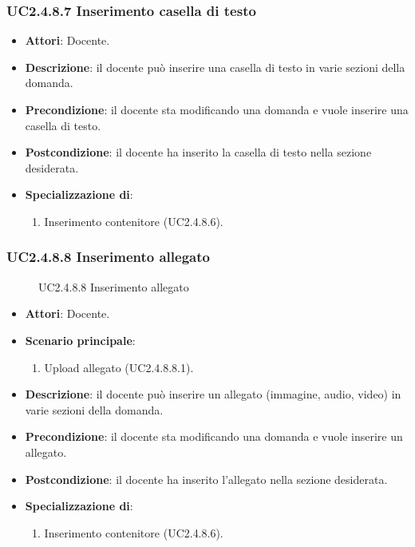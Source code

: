 \subsubsection{UC2.4.8.7 Inserimento casella di testo}
\begin{itemize}
\item \textbf{Attori}: Docente.
\item \textbf{Descrizione}: il docente può inserire una casella di testo in varie sezioni della domanda.
\item \textbf{Precondizione}: il docente sta modificando una domanda e vuole inserire una casella di testo.
\item \textbf{Postcondizione}: il docente ha inserito la casella di testo nella sezione desiderata.
\item \textbf{Specializzazione di}:
\begin{enumerate}
\item Inserimento contenitore (UC2.4.8.6).
\end{enumerate}
\end{itemize}
\subsubsection{UC2.4.8.8 Inserimento allegato}
\begin{figure}[H]
\centering
\noindent{}
\caption{UC2.4.8.8 Inserimento allegato}
\end{figure}
\begin{itemize}
\item \textbf{Attori}: Docente.
\item \textbf{Scenario principale}:
\begin{enumerate}
\item Upload allegato (UC2.4.8.8.1).
\end{enumerate}
\item \textbf{Descrizione}: il docente può inserire un allegato (immagine, audio, video) in varie sezioni della domanda.
\item \textbf{Precondizione}: il docente sta modificando una domanda e vuole inserire un allegato.
\item \textbf{Postcondizione}: il docente ha inserito l'allegato nella sezione desiderata.
\item \textbf{Specializzazione di}:
\begin{enumerate}
\item Inserimento contenitore (UC2.4.8.6).
\end{enumerate}
\end{itemize}
